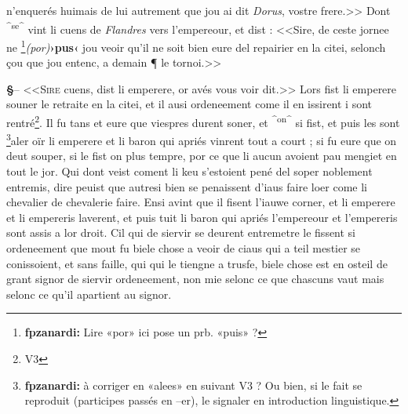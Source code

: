 \documentclass[12pt]{article} %
\newcommand{\colmar}[1]{\marginnote{[#1]}}          %
\newcommand{\persName}[1]{\emph{#1}} %
\newcommand{\placeName}[1]{\emph{#1}} %
\newcommand{\corr}[2]{\emph{(#1)}\textbf{›#2‹}} %
\newcommand{\add}[1]{\textsuperscript{#1}}       %
\newcommand{\supplied}[1]{\textlangle#1\textrangle} %
\newcommand{\fntooltip}[1]{\footnote{#1}}       %
\newcommand{\fnfpz}[1]{\footnote{\textbf{fpzanardi:} #1}} %
\newcounter{paranum}
\newcommand{\pnum}{\stepcounter{paranum}\textbf{§\arabic{paranum}}\quad}
\begin{document}
n'enquerés huimais de lui autrement que jou ai dit \persName{Dorus}, vostre frere.>> Dont \add{^se^} vint li cuens de \placeName{Flandres} vers l'empereour, et dist : <<Sire, de ceste jornee ne \fnfpz{Lire «por» ici pose un prb. «puis» ?}\corr{por}{pus} jou veoir qu'il ne soit bien eure del repairier en la citei, selonch çou que jou entenc, a demain ¶ le tornoi.>>


\pnum -- <<\lettrine[lines=2]{\color{darkred}S}{ire} cuens, dist li emperere, or avés vous voir dit.>> Lors fist li emperere souner le retraite en la citei, et il ausi ordeneement come il en issirent i sont rent\supplied{r}é\fntooltip{V3}. Il fu tans et eure que viespres durent soner, et \add{^on^} si fist, et puis les sont \fnfpz{à corriger en «alees» en suivant V3 ? Ou bien, si le fait se reproduit (participes passés en –er), le signaler en introduction linguistique.}aler oïr li emperere et li baron qui apriés vinrent tout a court ; si fu eure que on deut souper, si le fist on plus tempre, por ce que li aucun avoient pau mengiet en tout le jor. Qui dont veist coment li keu s'estoient pené del soper noblement entremis, dire peuist que autresi bien se penaissent d'iaus faire loer come li chevalier de chevalerie faire. Ensi avint que il fisent l'iauwe corner, et li emperere et li empereris laverent, et puis tuit li baron qui apriés l'empereour et l'empereris sont assis a lor droit. Cil qui de siervir se deurent entremetre le fissent si ordeneement que mout fu biele chose a veoir de ciaus qui a teil mestier se conissoient, et sans faille, qui qui le tiengne a trusfe, biele chose est en osteil de grant signor de siervir ordeneement, \colmar{5rb}\colmar{b} non mie selonc ce que chascuns vaut mais selonc ce qu'il apartient au signor.
\end{document}
